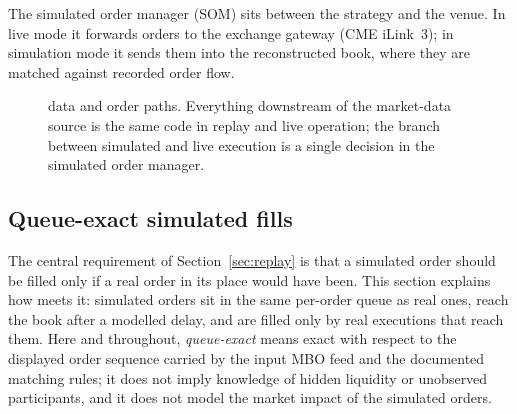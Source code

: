 The simulated order manager (SOM)
sits between the strategy and the venue. In live mode it forwards orders to the exchange gateway (CME iLink~3); in
simulation mode it sends them into the reconstructed book, where they are matched against recorded order flow.

\begin{figure}[ht]
\centering
{}
\caption{\kasparhft{} data and order paths. Everything downstream of the market-data source is the same
code in replay and live operation; the branch between simulated and live execution is a single
decision in the simulated order manager.}
\label{fig:kaspar}
\end{figure}


\subsection{Queue-exact simulated fills}
\label{sec:kaspar-fills}

The central requirement of Section~\ref{sec:replay} is that a simulated order should be filled only if
a real order in its place would have been. This section explains how \kasparhft{} meets it: simulated
orders sit in the same per-order queue as real ones, reach the book after a modelled delay, and are
filled only by real executions that reach them. Here and throughout, \emph{queue-exact} means exact
with respect to the displayed order sequence carried by the input MBO feed and the documented matching
rules; it does not imply knowledge of hidden liquidity or unobserved participants, and it does not model
the market impact of the simulated orders.

